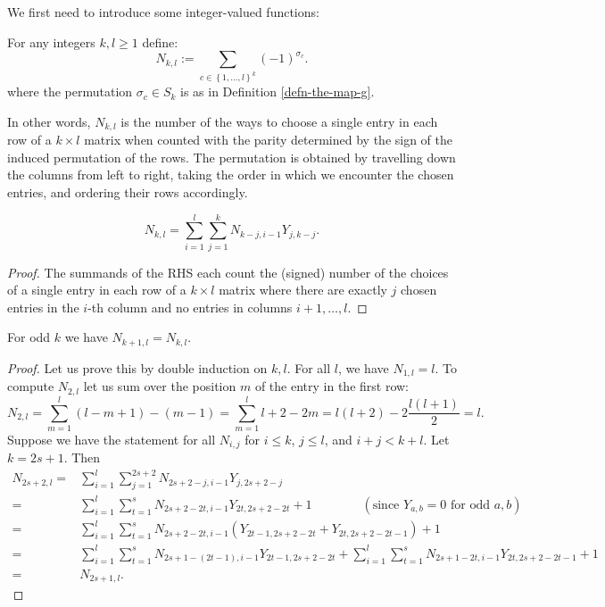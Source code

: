 \documentclass[12pt,a4paper,reqno]{amsart}
\begin{document}
We first need to introduce some integer-valued functions:
\begin{defn}
For any integers $k, l \geq 1$ define:
\begin{equation}
N_{k,l} := \sum_{c \in \left\{1,\dots, l\right\}^k} (-1)^{\sigma_c}.
\end{equation}
where the permutation $\sigma_c \in S_k$ is as in Definition 
\ref{defn-the-map-g}.
\end{defn}
In other words, $N_{k,l}$ is the number of the ways to choose a single 
entry in each row of a $k \times l$ matrix when counted with the
parity determined by the sign of the induced permutation of the rows.
The permutation is obtained by travelling down the columns 
from left to right, taking the order in which we encounter 
the chosen entries, and ordering their rows accordingly. 

\begin{lemma}
$$N_{k,l} = \sum_{i=1}^l \sum_{j=1}^{k} N_{k-j,i-1} Y_{j,k-j}.$$
\end{lemma}
\begin{proof}
The summands of the RHS each count the (signed) number of the choices of 
a single entry in each row of a $k \times l$ matrix where there are exactly $j$
chosen entries in the $i$-th column and no entries in columns $i+1,\ldots, l$.
\end{proof}

\begin{lemma}
\label{lemma-N(k+1)l-equals-Nkl-for-odd-k}
For odd $k$ we have $N_{k+1,l} = N_{k,l}$.  
\end{lemma}
\begin{proof}
Let us prove this by double induction on $k,l$. 
For all $l$, we have $N_{1,l}=l$. To compute $N_{2,l}$ let us sum over the position $m$ of the entry in the first row:
$$
N_{2,l}=\sum\limits_{m=1}^l (l-m+1)-(m-1)=\sum\limits_{m=1}^l l+2-2m = l(l+2)-2\frac{l(l+1)}{2}=l.
$$
Suppose we have the statement for all $N_{i,j}$ for $i\leq k$, $j\leq l$, and $i+j<k+l$. 
Let $k=2s+1$. Then 
\begin{align*}
N_{2s+2, l}  = & \sum\limits_{i=1}^l \sum\limits_{j=1}^{2s+2} N_{2s+2-j,i-1}Y_{j,2s+2-j}\\
= & \sum\limits_{i=1}^l \sum\limits_{t=1}^{s} N_{2s+2-2t,i-1}Y_{2t,2s+2-2t}+1
\qquad\qquad (\text{since }Y_{a,b}=0 \text{ for odd } a, b)\\
= & \sum\limits_{i=1}^l \sum\limits_{t=1}^{s} N_{2s+2-2t, i-1} (Y_{2t-1,2s+2-2t} + Y_{2t, 2s+2-2t-1}) +1\\
= & \sum\limits_{i=1}^l \sum\limits_{t=1}^{s} N_{2s+1-(2t-1), i-1} Y_{2t-1,2s+2-2t}  + \sum\limits_{i=1}^l \sum\limits_{t=1}^s N_{2s+1-2t, i-1} Y_{2t, 2s+2-2t-1}+1\\
= &N_{2s+1, l}.
\end{align*}
\end{proof}
\end{document}
